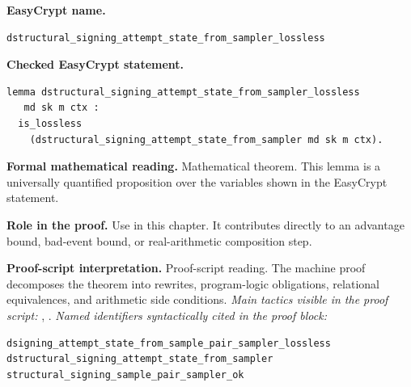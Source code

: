 \begin{formaltheorem}
\noindent\textbf{EasyCrypt name.}
\begin{lstlisting}[language=EasyCrypt,basicstyle=\ttfamily\scriptsize]
dstructural_signing_attempt_state_from_sampler_lossless
\end{lstlisting}
\noindent\textbf{Checked EasyCrypt statement.}
\begin{lstlisting}[language=EasyCrypt,basicstyle=\ttfamily\scriptsize]
lemma dstructural_signing_attempt_state_from_sampler_lossless
   md sk m ctx :
  is_lossless
    (dstructural_signing_attempt_state_from_sampler md sk m ctx).
\end{lstlisting}
\noindent\textbf{Formal mathematical reading.}
Mathematical theorem. This lemma is a universally quantified proposition over the variables shown in the EasyCrypt statement.

\noindent\textbf{Role in the proof.}
Use in this chapter. It contributes directly to an advantage bound, bad-event bound, or real-arithmetic composition step.

\noindent\textbf{Proof-script interpretation.}
Proof-script reading. The machine proof decomposes the theorem into rewrites, program-logic obligations, relational equivalences, and arithmetic side conditions.
\emph{Main tactics visible in the proof script:} , .
\emph{Named identifiers syntactically cited in the proof block:}
\begin{lstlisting}[language=EasyCrypt,basicstyle=\ttfamily\scriptsize]
dsigning_attempt_state_from_sample_pair_sampler_lossless
dstructural_signing_attempt_state_from_sampler
structural_signing_sample_pair_sampler_ok
\end{lstlisting}

\end{formaltheorem}

